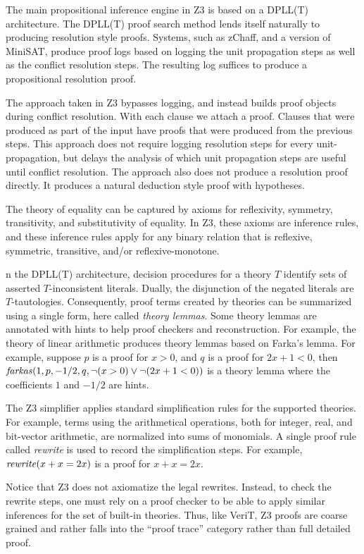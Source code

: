 \documentclass{llncs}
\begin{document}
The main propositional inference engine in Z3 is based on a DPLL(T) architecture.
The DPLL(T) proof search method lends itself naturally to producing resolution style proofs.
Systems, such as zChaff, and a version of MiniSAT, produce proof logs based on logging the
unit propagation steps as well as the conflict resolution steps. The resulting log suffices to produce a
propositional resolution proof.

The approach taken in Z3 bypasses logging, and instead builds proof
objects during conflict resolution.  With each clause we attach a
proof. Clauses that were produced as part of the input have proofs
that were produced from the previous steps. This approach does not
require logging resolution steps for every unit-propagation, but
delays the analysis of which unit propagation steps are useful until
conflict resolution. The approach also does not produce a resolution
proof directly. It produces a natural deduction style proof with
hypotheses.

The theory of equality can be captured by axioms for reflexivity,
symmetry, transitivity, and substitutivity of equality. In Z3,
these axioms are inference rules, and these inference rules apply
for any binary relation that is reflexive,
symmetric, transitive, and/or reflexive-monotone.

n the DPLL(T) architecture, decision procedures for a theory $T$
identify sets of asserted $T$-inconsistent literals. Dually, the
disjunction of the negated literals are $T$-tautologies. Consequently,
proof terms created by theories can be summarized using a single form,
here called \emph{theory lemmas}. Some theory lemmas are annotated
with hints to help proof checkers and reconstruction. For example, the
theory of linear arithmetic produces theory lemmas based on Farka's
lemma. For example, suppose $p$ is a proof for $x > 0$, and $q$ is a
proof for $2x + 1 < 0$, then $\mbox{\emph{farkas}}(1, p, -1/2, q, \neg(x > 0) \vee \neg(2x + 1 < 0))$
is a theory lemma where the coefficients $1$ and $-1/2$ are hints.



The Z3 simplifier applies standard simplification rules for the
supported theories. For example, terms using the arithmetical operations,
both for integer, real, and bit-vector arithmetic, are normalized into sums of monomials.
A single proof rule called \emph{rewrite} is used to record the simplification steps.
For example, $\mbox{\emph{rewrite}}(x + x = 2 x)$ is a proof for $x + x = 2x$.

Notice that Z3 does not axiomatize the legal rewrites.
Instead, to check the rewrite steps, one must rely on a
proof checker to be able to apply similar inferences for the set of built-in theories.
Thus, like VeriT, Z3 proofs are coarse grained and rather falls into the “proof trace”
category rather than full detailed proof.
\end{document}

